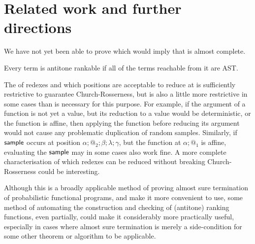 \section{Related work and further directions}
\label{sec:related}





We have not yet been able to prove  which would imply that  is almost complete.
\begin{conjecture}
\label{conj:antitone}
Every term is antitone rankable if all of the terms reachable from it are AST.
\end{conjecture}

The  of redexes and which positions are acceptable to reduce at is sufficiently restrictive to guarantee Church-Rosserness, but is also a little more restrictive in some cases than is necessary for this purpose. For example, if the argument of a function is not yet a value, but its reduction to a value would be deterministic, or the function is affine, then applying the function before reducing its argument would not cause any problematic duplication of random samples. Similarly, if $\mathsf{sample}$ occurs at position $\alpha;@_2;\beta;\lambda;\gamma$, but the function at $\alpha;@_1$ is affine, evaluating the $\mathsf{sample}$ may in some cases also work fine. A more complete characterisation of which redexes can be reduced without breaking Church-Rosserness could be interesting.

Although this is a broadly applicable method of proving almost sure termination of probabilistic functional programs, and  make it more convenient to use, some method of automating the construction and checking of (antitone) ranking functions, even partially, could make it considerably more practically useful, especially in cases where almost sure termination is merely a side-condition for some other theorem or algorithm to be applicable.
